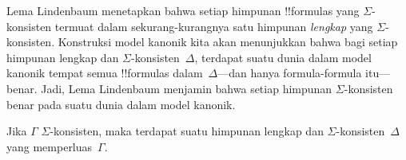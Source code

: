 \documentclass[../../../include/open-logic-section]{subfiles}
\begin{document}


Lema Lindenbaum menetapkan bahwa setiap himpunan !!{formula}s yang
$\Sigma$-konsisten termuat dalam sekurang-kurangnya satu himpunan
\emph{lengkap} yang $\Sigma$-konsisten. Konstruksi model kanonik kita akan
menunjukkan bahwa bagi setiap himpunan lengkap dan
$\Sigma$-konsisten~$\Delta$, terdapat suatu dunia dalam model kanonik tempat
semua !!{formula}s dalam~$\Delta$---dan hanya formula-formula itu---benar.
Jadi, Lema Lindenbaum menjamin bahwa setiap
himpunan $\Sigma$-konsisten benar pada suatu dunia dalam model kanonik.

\begin{thm}
  Jika $\Gamma$ $\Sigma$-konsisten, maka terdapat suatu himpunan lengkap dan
  $\Sigma$-konsisten~$\Delta$ yang memperluas~$\Gamma$.
\end{thm}
\end{document}
